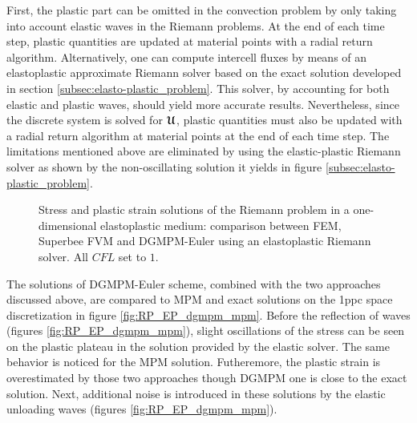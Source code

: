 First, the plastic part can be omitted in the convection problem by only taking into account elastic waves in the Riemann problems. At the end of each time step, plastic quantities are updated at material points with a radial return algorithm. %
Alternatively, one can compute intercell fluxes by means of an elastoplastic approximate Riemann solver based on the exact solution developed in section \ref{subsec:elasto-plastic_problem}. This solver, by accounting for both elastic and plastic waves, should yield more accurate results.
Nevertheless, since the discrete system is solved for ${\boldsymbol{\mathcal{U}}}$, plastic quantities must also be updated with a radial return algorithm at material points at the end of each time step. The limitations mentioned above are eliminated by using the elastic-plastic Riemann solver as shown by the non-oscillating solution it yields in figure \ref{subsec:elasto-plastic_problem}.

\begin{figure}[h!]
  \centering
  { \label{subfig:ep_dgmpm_fvm1}}
  { \label{subfig:ep_dgmpm_fvm2}}
  { \label{subfig:ep_dgmpm_fvm3}}
  {}
  \caption{Stress and plastic strain solutions of the Riemann problem in a one-dimensional elastoplastic medium: comparison between FEM, Superbee FVM and DGMPM-Euler using an elastoplastic Riemann solver. All $CFL$ set to $1$.}
  \label{fig:RP_EP_dgmpm_fvm}
\end{figure}
The solutions of DGMPM-Euler scheme, combined with the two approaches discussed above, are compared to MPM and exact solutions on the 1ppc space discretization in figure \ref{fig:RP_EP_dgmpm_mpm}.
Before the reflection of waves (figures \ref{fig:RP_EP_dgmpm_mpm}), slight oscillations of the stress can be seen on the plastic plateau in the solution provided by the elastic solver. The same behavior is noticed for the MPM solution. Futheremore, the plastic strain is overestimated by those two approaches though DGMPM one is close to the exact solution. Next, additional noise is introduced in these solutions by the elastic unloading waves (figures \ref{fig:RP_EP_dgmpm_mpm}).


